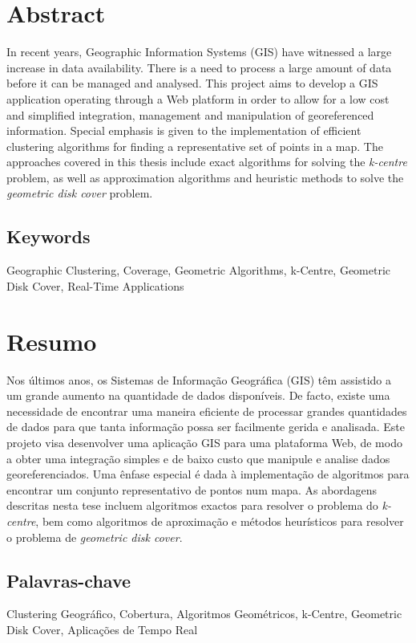 \setcounter{page}{0}

\section*{\huge Abstract}

In recent years, Geographic Information Systems (GIS) have witnessed a large increase in data availability. There is a need to process a large amount of data before it can be managed and analysed. This project aims to develop a GIS application operating through a Web platform in order to allow for a low cost and simplified integration, management and manipulation of georeferenced information. Special emphasis is given to the implementation of efficient clustering algorithms for finding a representative set of points in a map. The approaches covered in this thesis include exact algorithms for solving the \emph{k-centre} problem, as well as approximation algorithms and heuristic methods to solve the \emph{geometric disk cover} problem.

\subsection*{\large Keywords}

Geographic Clustering, Coverage, Geometric Algorithms, k-Centre, Geometric Disk Cover, Real-Time Applications

\section*{\huge Resumo}

Nos últimos anos, os Sistemas de Informação Geográfica (GIS) têm assistido a um grande aumento na quantidade de dados disponíveis. De facto, existe uma necessidade de encontrar uma maneira eficiente de processar grandes quantidades de dados para que tanta informação possa ser facilmente gerida e analisada. Este projeto visa desenvolver uma aplicação GIS para uma plataforma Web, de modo a obter uma integração simples e de baixo custo que manipule e analise dados georeferenciados. Uma ênfase especial é dada à implementação de algoritmos para encontrar um conjunto representativo de pontos num mapa. As abordagens descritas nesta tese incluem algoritmos exactos para resolver o problema do \emph{k-centre}, bem como algoritmos de aproximação e métodos heurísticos para resolver o problema de \emph{geometric disk cover}.

\subsection*{Palavras-chave}

Clustering Geográfico, Cobertura, Algoritmos Geométricos, k-Centre, Geometric Disk Cover, Aplicações de Tempo Real

